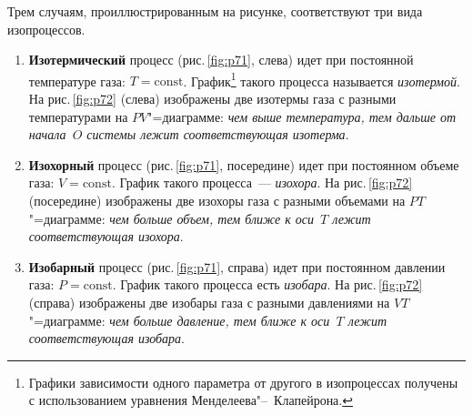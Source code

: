 \documentclass[main.tex]{subfiles}
\begin{document}
Трем случаям, проиллюстрированным на рисунке, соответствуют три вида изопроцессов.
\begin{enumerate}
    \item \textbf{Изотермический} процесс (рис.\,\ref{fig:p71}, слева) идет при постоянной температуре газа: $T=\mathrm{const}$. График\footnote{Графики зависимости одного параметра от другого в изопроцессах получены с использованием уравнения Менделеева"--~Клапейрона.} такого процесса называется \emph{изотермой}. На рис.\,\ref{fig:p72} (слева) изображены две изотермы газа с разными температурами на $PV$"=диаграмме: \emph{чем выше температура, тем дальше от начала~$O$ системы лежит соответствующая изотерма}. 
    \item \textbf{Изохорный} процесс (рис.\,\ref{fig:p71}, посередине) идет при постоянном объеме газа: $V = \mathrm{const}$. График такого процесса~--- \emph{изохора}. На рис.\,\ref{fig:p72} (посередине) изображены две изохоры газа с разными объемами на $PT$"=диаграмме: \emph{чем больше объем, тем ближе к оси~$T$ лежит соответствующая изохора}. 
    \item \textbf{Изобарный} процесс (рис.\,\ref{fig:p71}, справа) идет при постоянном давлении газа: $P = \mathrm{const}$. График такого процесса есть \emph{изобара}. На рис.\,\ref{fig:p72} (справа) изображены две изобары газа с разными давлениями на $VT$"=диаграмме: \emph{чем больше давление, тем ближе к оси~$T$ лежит соответствующая изобара}.
\end{enumerate}

\end{document}
